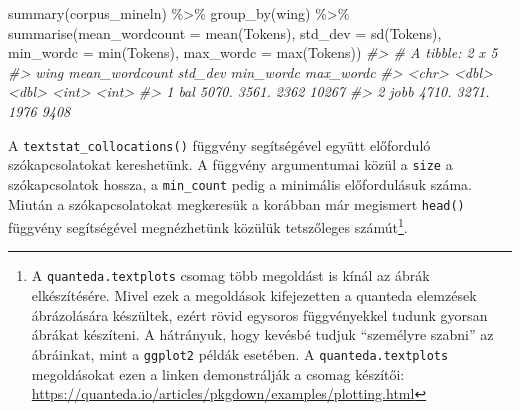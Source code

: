 \documentclass[
]{book}
\newenvironment{Shaded}{\begin{snugshade}}{\end{snugshade}}
\newcommand{\AttributeTok}[1]{\textcolor[rgb]{0.77,0.63,0.00}{#1}}
\newcommand{\CommentTok}[1]{\textcolor[rgb]{0.56,0.35,0.01}{\textit{#1}}}
\newcommand{\FunctionTok}[1]{\textcolor[rgb]{0.00,0.00,0.00}{#1}}
\newcommand{\NormalTok}[1]{#1}
\newcommand{\SpecialCharTok}[1]{\textcolor[rgb]{0.00,0.00,0.00}{#1}}
\begin{document}
\begin{Shaded}
\begin{Highlighting}[]
\FunctionTok{summary}\NormalTok{(corpus\_mineln) }\SpecialCharTok{\%\textgreater{}\%}
  \FunctionTok{group\_by}\NormalTok{(wing) }\SpecialCharTok{\%\textgreater{}\%}
  \FunctionTok{summarise}\NormalTok{(}\AttributeTok{mean\_wordcount =} \FunctionTok{mean}\NormalTok{(Tokens), }\AttributeTok{std\_dev =} \FunctionTok{sd}\NormalTok{(Tokens), }\AttributeTok{min\_wordc =} \FunctionTok{min}\NormalTok{(Tokens), }\AttributeTok{max\_wordc =} \FunctionTok{max}\NormalTok{(Tokens))}
\CommentTok{\#\textgreater{} \# A tibble: 2 x 5}
\CommentTok{\#\textgreater{}   wing  mean\_wordcount std\_dev min\_wordc max\_wordc}
\CommentTok{\#\textgreater{}   \textless{}chr\textgreater{}          \textless{}dbl\textgreater{}   \textless{}dbl\textgreater{}     \textless{}int\textgreater{}     \textless{}int\textgreater{}}
\CommentTok{\#\textgreater{} 1 bal            5070.   3561.      2362     10267}
\CommentTok{\#\textgreater{} 2 jobb           4710.   3271.      1976      9408}
\end{Highlighting}
\end{Shaded}

A \texttt{textstat\_collocations()} függvény segítségével együtt
előforduló szókapcsolatokat kereshetünk. A függvény argumentumai közül a
\texttt{size} a szókapcsolatok hossza, a \texttt{min\_count} pedig a
minimális előfordulásuk száma. Miután a szókapcsolatokat megkeresük a
korábban már megismert \texttt{head()} függvény segítségével
megnézhetünk közülük tetszőleges számút\footnote{A
  \texttt{quanteda.textplots} csomag több megoldást is kínál az ábrák
  elkészítésére. Mivel ezek a megoldások kifejezetten a quanteda
  elemzések ábrázolására készültek, ezért rövid egysoros függvényekkel
  tudunk gyorsan ábrákat készíteni. A hátrányuk, hogy kevésbé tudjuk
  ``személyre szabni'' az ábráinkat, mint a \texttt{ggplot2} példák
  esetében. A \texttt{quanteda.textplots} megoldásokat ezen a linken
  demonstrálják a csomag készítői:
  \url{https://quanteda.io/articles/pkgdown/examples/plotting.html}}.
\end{document}
